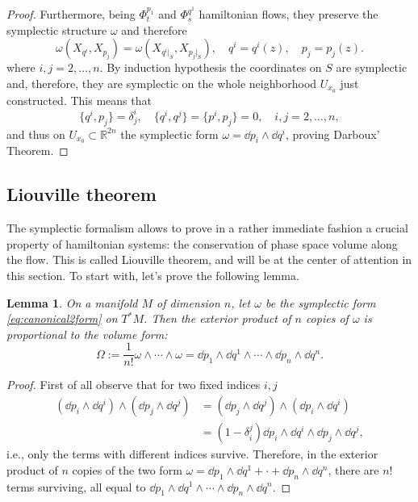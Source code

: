 \documentclass[english,fontsize=11pt,paper=b5]{scrbook}
\newtheorem{lemma}[theorem]{Lemma}
\theoremstyle{definition}
\begin{document}
\begin{proof}
      Furthermore, being $\Phi_t^{p_1}$ and $\Phi_s^{q^1}$ hamiltonian flows, they preserve the symplectic structure $\omega$ and therefore
      \begin{equation}
        \omega(X_{q^i}, X_{p_j}) = \omega(X_{q^i|_S}, X_{p_j|_S}),
        \quad q^i = q^i(z),
        \quad p_j = p_j(z).
      \end{equation}
      where $i,j=2,\ldots,n$.
      By induction hypothesis the coordinates on $S$ are symplectic and, therefore, they are symplectic on the whole neighborhood $U_{x_0}$ just constructed.
      This means that
      \begin{equation}
        \big\{q^i, p_j\big\} = \delta_j^i, \quad
        \big\{q^i, q^j\big\} = \big\{p^i, p_j\big\} = 0, \quad
        i,j=2,\ldots,n,
      \end{equation}
      and thus on $U_{x_0}\subset\mathbb{R}^{2n}$ the symplectic form $\omega=\dd p_i \wedge \dd q^i$, proving Darboux' Theorem.
    \end{proof}

    \subsection{Liouville theorem}

    The symplectic formalism allows to prove in a rather immediate fashion a crucial property of hamiltonian systems: the conservation of phase space volume along the flow.
    This is called Liouville theorem, and will be at the center of attention in this section.
    To start with, let's prove the following lemma.

    \begin{lemma}
      On a manifold $M$ of dimension $n$, let $\omega$ be the symplectic form \eqref{eq:canonical2form} on $T^* M$. Then the exterior product of $n$ copies of $\omega$ is proportional to the volume form:
      \begin{equation}
        \Omega := \frac1{n!} \omega \wedge \cdots \wedge \omega = \dd p_1 \wedge \dd q^1 \wedge \cdots \wedge \dd p_n \wedge \dd q^n.
      \end{equation}
    \end{lemma}
    \begin{proof}
      First of all observe that for two fixed indices $i,j$
      \begin{align}
        (\dd p_i \wedge \dd q^i)\wedge (\dd p_j \wedge \dd q^j) & =
        (\dd p_j \wedge \dd q^j)\wedge (\dd p_i \wedge \dd q^i)     \\
                                                                & =
                                                                (1-\delta_i^j) \dd p_i \wedge \dd q^i \wedge \dd p_j \wedge \dd q^j,
      \end{align}
      i.e., only the terms with different indices survive.
      Therefore, in the exterior product of $n$ copies of the two form $\omega = \dd p_1 \wedge \dd q^1 + \cdot + \dd p_n \wedge \dd q^n$, there are $n!$ terms surviving, all equal to $\dd p_1 \wedge \dd q^1 \wedge \cdots \wedge \dd p_n \wedge \dd q^n$.
    \end{proof}
\end{document}

